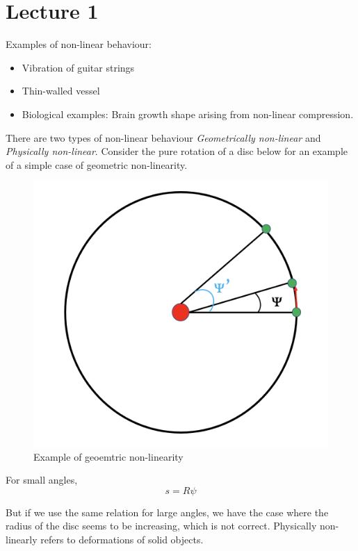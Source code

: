 \section{Lecture 1}
Examples of non-linear behaviour: 
\begin{itemize}
	\item Vibration of guitar strings 
	\item Thin-walled vessel 
	\item Biological examples: Brain growth shape arising from non-linear compression. 
\end{itemize}
There are two types of non-linear behaviour \emph{Geometrically non-linear} and \emph{Physically non-linear}. Consider the pure rotation of a disc below for an example of a simple case of geometric non-linearity. 
\begin{figure}[H]
	\centering 
	\includegraphics[scale = 0.4]{Lecture 1_nlm/images/Geometric nl}
	\caption{Example of geoemtric non-linearity}
	\label{geometric non-linearity}
\end{figure}
For small angles, 
\begin{equation}
	s = R \psi
	\label{small angle formula}
\end{equation}

But if we use the same relation for large angles, we have the case where the radius of the disc seems to be increasing, which is not correct. Physically non-linearly refers to deformations of solid objects. 
